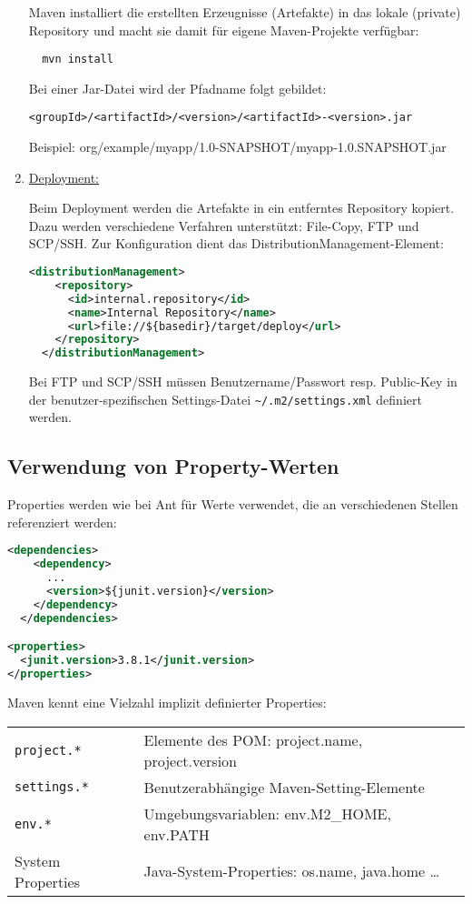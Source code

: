 \begin{enumerate}
Maven installiert die erstellten Erzeugnisse (Artefakte) in das lokale (private)
Repository und macht sie damit für eigene Maven-Projekte verfügbar:
\begin{lstlisting}
  mvn install
\end{lstlisting}
Bei einer Jar-Datei wird der Pfadname folgt gebildet:
\begin{verbatim}
<groupId>/<artifactId>/<version>/<artifactId>-<version>.jar
\end{verbatim}
Beispiel: org/example/myapp/1.0-SNAPSHOT/myapp-1.0.SNAPSHOT.jar
%
\newslide
\item \underline{Deployment:}

Beim Deployment werden die Artefakte in ein entferntes Repository
kopiert. Dazu werden verschiedene Verfahren unterstützt: File-Copy,
FTP und SCP/SSH.
Zur Konfiguration dient das DistributionManagement-Element:
\begin{lstlisting}[language=xml,
  morekeywords={distributionManagement,repository,id,name,url}]
  <distributionManagement>
    <repository>
      <id>internal.repository</id>
      <name>Internal Repository</name>
      <url>file://${basedir}/target/deploy</url>
    </repository>
  </distributionManagement>
\end{lstlisting}
Bei FTP und SCP/SSH müssen Benutzername/Passwort resp. Public-Key in
der benutzer-spezifischen Settings-Datei \verb+~/.m2/settings.xml+
definiert werden.
\end{enumerate}
\newslide
\subsection{Verwendung von Property-Werten}
Properties werden wie bei Ant für
Werte verwendet, die an verschiedenen Stellen referenziert werden:
\begin{lstlisting}[language=xml,
 morekeywords={dependencies,dependency,groupId,artifactId,
   version,scope,properties,junit}]
  <dependencies>
    <dependency>
      ...
      <version>${junit.version}</version>
    </dependency>
  </dependencies>

<properties>
  <junit.version>3.8.1</junit.version>
</properties>
\end{lstlisting}
\newslide
Maven kennt eine Vielzahl implizit definierter Properties:

\begin{tabularx}{\linewidth}{lX}
\verb+project.*+ & Elemente des POM: project.name, project.version\\
\verb+settings.*+ & Benutzerabhängige Maven-Setting-Elemente\\
\verb+env.*+ & Umgebungsvariablen: env.M2\_HOME, env.PATH \\
System Properties & Java-System-Properties: os.name, java.home \ldots\\
\end{tabularx}
\newslide
